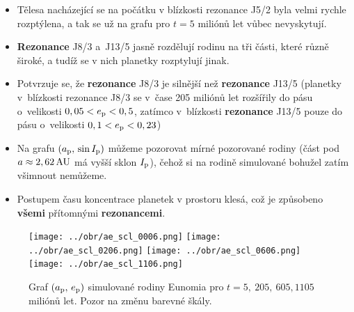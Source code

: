 \documentclass{beamer}
\newlength{\vyska}
\newlength{\vyskaB}
\newlength{\main}
\begin{document}
\begin{frame}
\begin{columns}[t]
\begin{column}{\main}
\begin{tcolorbox}[title=Simulace orbitálního vývoje\phantom{Úy},height=0.75\vyskaB]
\begin{multicols}{2}
\begin{itemize}
\item 
Tělesa nacházející se na počátku v blízkosti rezonance J5/2 byla velmi rychle rozptýlena, a tak se už na grafu pro $t=5$ miliónů let vůbec nevyskytují.

\item
\textbf{Rezonance} J8/3 a~J13/5 jasně rozdělují rodinu na tři části, které různě široké, a tudíž se v nich planetky rozptylují jinak.

\item 
Potvrzuje se, že \textbf{rezonance} J8/3 je silnější než \textbf{rezonance} J13/5 (planetky v~blízkosti rezonance J8/3 se v~čase 205 miliónů let rozšířily do pásu o~velikosti $0,05<e_{\rm p}<0,5$, zatímco v~blízkosti \textbf{rezonance} J13/5 pouze do pásu o~velikosti $0,1<e_{\rm p}<0,23$)

\item
Na grafu $(a_{\rm p},\,\sin I_{\rm p})$ můžeme pozorovat mírné  pozorované rodiny (část pod $a\approx2,62\,{\rm AU}$ má vyšší sklon $I_{\rm p}$), čehož si na rodině simulované bohužel zatím všimnout nemůžeme.

\item Postupem času koncentrace planetek v prostoru klesá, což je způsobeno \textbf{všemi} přítomnými \textbf{rezonancemi}.


\end{itemize}
\end{multicols}

\vspace{-1cm}

	\begin{figure}
		\centering
		\texttt{[image: ../obr/ae\_scl\_0006.png]}
		\texttt{[image: ../obr/ae\_scl\_0206.png]}
		\texttt{[image: ../obr/ae\_scl\_0606.png]}
		\texttt{[image: ../obr/ae\_scl\_1106.png]}
		\captionsetup{width=.88\linewidth}
		\caption{Graf $(a_{\rm p},\,e_{\rm p})$ simulované rodiny Eunomia pro $t=5,\ 205,\ 605, 1105$ miliónů let. Pozor na změnu barevné škály.} 


\end{figure}
\end{tcolorbox}
\end{column}
\end{columns}
\end{frame}
\end{document}
